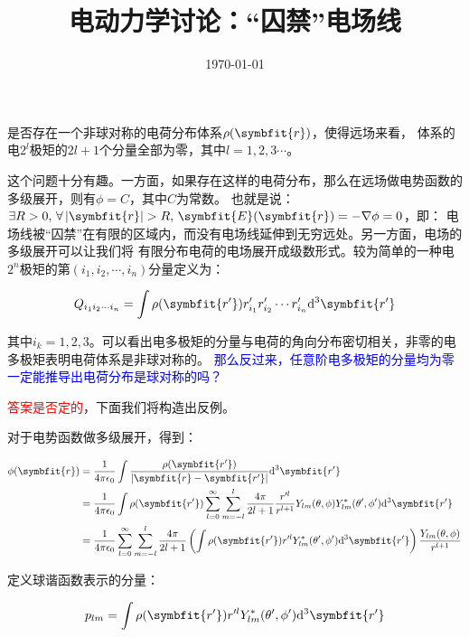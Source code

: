 \documentclass[11pt,a4paper]{ctexart}
\title{电动力学讨论：“囚禁”电场线}
\author{}
\date{\today}
\newcommand{\dd}{\mathrm{d}}
\begin{document}
\maketitle

{
    \kaishu 是否存在一个非球对称的电荷分布体系$\rho(\symbfit{r})$，使得远场来看，
    体系的电$2^l$极矩的$2l+1$个分量全部为零，其中$l=1,2,3\cdots$。
    \label{question}
}

\bigskip

这个问题十分有趣。一方面，如果存在这样的电荷分布，那么在远场做电势函数的多级展开，则有$\phi=C$，其中$C$为常数。
也就是说：$\exists R>0,\,\forall\left|\symbfit{r}\right|>R,\,\symbfit{E}(\symbfit{r})=-\nabla\phi=0$，即：
电场线被“囚禁”在有限的区域内，而没有电场线延伸到无穷远处。另一方面，电场的多级展开可以让我们将
有限分布电荷的电场展开成级数形式。较为简单的一种电$2^n$极矩的第$(i_1,i_2,\cdots,i_n)$分量定义为：

\begin{equation}
    Q_{i_1i_2\cdots i_n}=\int\rho(\symbfit{r'})r'_{i_1}r'_{i_2}\cdots r'_{i_n}\dd^3\symbfit{r'}
    \label{eq:define}
\end{equation}

其中$i_k=1,2,3$。可以看出电多极矩的分量与电荷的角向分布密切相关，非零的电多极矩表明电荷体系是非球对称的。
\textcolor{blue}{那么反过来，任意阶电多极矩的分量均为零一定能推导出电荷分布是球对称的吗？}

\bigskip

\textcolor{red}{答案是否定的}，下面我们将构造出反例。

\bigskip

对于电势函数做多级展开，得到：

\begin{align}
    \phi(\symbfit{r})&=\frac{1}{4\pi\epsilon_0}\int\frac{\rho(\symbfit{r'})}{\left|\symbfit{r}-\symbfit{r'}\right|}\dd^3\symbfit{r'} \notag \\
    &=\frac{1}{4\pi\epsilon_0}\int\rho(\symbfit{r'})\sum_{l=0}^{\infty}\sum_{m=-l}^{l}\frac{4\pi}{2l+1}\frac{r'^l}{r^{l+1}}Y_{lm}(\theta,\phi)Y_{lm}^*(\theta',\phi')\dd^3\symbfit{r'} \notag\\
    &=\frac{1}{4\pi\epsilon_0}\sum_{l=0}^{\infty}\sum_{m=-l}^{l}\frac{4\pi}{2l+1}\left(\int\rho(\symbfit{r'})r'^lY_{lm}^*(\theta',\phi')\dd^3\symbfit{r'}\right)\frac{Y_{lm}(\theta,\phi)}{r^{l+1}}
    \label{eq:Multipole}
\end{align}

定义球谐函数表示的分量：

\begin{equation}
    p_{lm}=\int\rho(\symbfit{r'})r'^lY_{lm}^*(\theta',\phi')\dd^3\symbfit{r'}
\end{equation}
\end{document}
